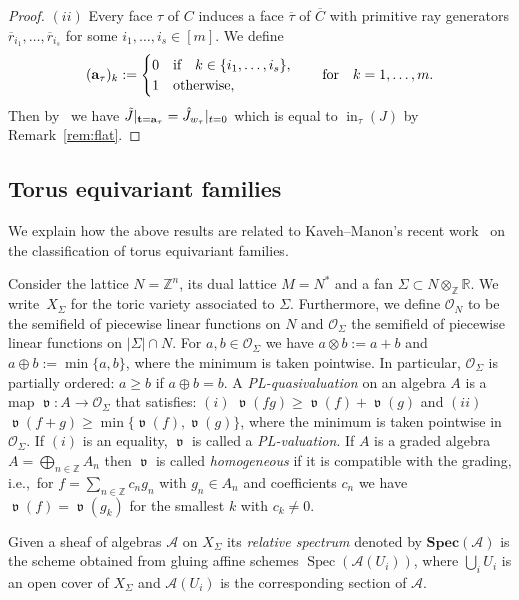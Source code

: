 \documentclass[pdftex]{sigma}%
\numberwithin{equation}{section}
\DeclareMathOperator{\init}{in}
\DeclareMathOperator{\val}{\mathfrak v}
\begin{document}
\begin{proof}
$(ii)$ Every face $\tau$ of $C$ induces a face $\overline{\tau}$ of $\overline{C}$ with primitive ray generators $\overline{r}_{i_1},\dots, \overline{r}_{i_{s}}$ for some $i_1,\dots,i_s\in [m]$.
 We define
 \begin{equation*}%
 ({\bf a}_{\tau})_k:=
 \begin{cases}
 0 & \text{if}\quad k\in\{i_1,\dots,i_{s}\},\\
 1 & \text{otherwise},
 \end{cases}
 \qquad
\text{for}
\quad k=1,\ldots,m.
 \end{equation*}
 Then by~ we have $\tilde J\vert_{{\bf t}={\bf a}_\tau}=\hat J_{w_\tau}\vert_{t=0}$ which is equal to $\init_{\tau}(J)$ by Remark~\ref{rem:flat}.
\end{proof}

\subsection{Torus equivariant families}\label{sec:toric families}

We explain how the above results are related to Kaveh--Manon's recent work~\cite{KM-toricbundles} on the classification of torus equivariant families.

Consider the lattice $N=\mathbb Z^n$, its dual lattice $M=N^*$ and a fan $\Sigma\subset N\otimes_{\mathbb Z}\mathbb R$.
We write~$X_\Sigma$ for the toric variety associated to $\Sigma$.
Furthermore, we define $\mathcal O_N$ to be the semifield of piecewise linear functions on $N$ and $\mathcal O_{\Sigma}$ the semifield of piecewise linear functions on $\vert\Sigma\vert\cap N$.
For $a,b\in\mathcal O_{\Sigma}$ we have $a\otimes b:=a+b$ and $a\oplus b:=\min\{a,b\}$, where the minimum is taken pointwise.
In particular, $\mathcal O_{\Sigma}$ is partially ordered: $a\ge b$ if $a\oplus b=b$.
A {\it PL-quasivaluation} on an algebra $A$ is a map $\val\colon A\to \mathcal O_{\Sigma}$ that satisfies: $(i)$ $\val(fg)\ge \val(f)+\val(g)$ and $(ii)$ $\val(f+g)\ge \min\{\val(f),\val(g)\}$, where the minimum is taken pointwise in $\mathcal O_{\Sigma}$.
If $(i)$ is an equality, $\val$ is called a {\it PL-valuation}.
If $A$ is a graded algebra $A=\bigoplus_{n\in \mathbb Z} A_n$ then $\val$ is called {\it homogeneous} if it is compatible with the grading, i.e.,~for $f=\sum_{n\in \mathbb Z} c_n g_n$ with $g_n\in A_n$ and coefficients $c_n$ we have $\val(f)=\val(g_k)$ for the smallest $k$ with $c_k\not =0$.

Given a sheaf of algebras $\mathcal A$ on $X_\Sigma$ its {\it relative spectrum} denoted by $\mathbf{Spec}(\mathcal A)$ is the scheme obtained from gluing affine schemes $\operatorname{Spec}(\mathcal A(U_i))$, where $\bigcup_i U_i$ is an open cover of $X_\Sigma$ and $\mathcal A(U_i)$ is the corresponding section of $\mathcal A$.
\end{document}
